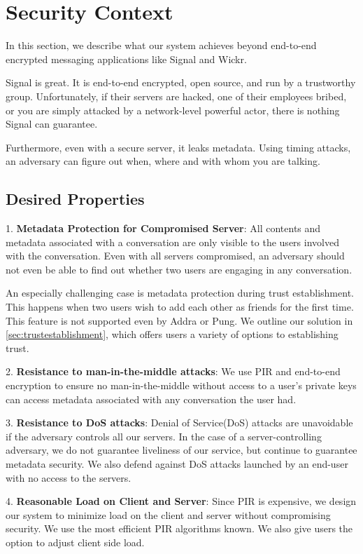 \section{Security Context}
\label{sec:securitycontext}


In this section, we describe what our system achieves beyond end-to-end encrypted messaging applications like Signal and Wickr.

Signal is great. It is end-to-end encrypted, open source, and run by a trustworthy group. Unfortunately, if their servers are hacked, one of their employees bribed, or you are simply attacked by a network-level powerful actor, there is nothing Signal can guarantee. 

Furthermore, even with a secure server, it leaks metadata. Using timing attacks, an adversary can figure out when, where and with whom you are talking. 

\subsection{Desired Properties}

1. \textbf{Metadata Protection for Compromised Server}: All contents and metadata associated with a conversation are only visible to the users involved with the conversation. Even with all servers compromised, an adversary should not even be able to find out whether two users are engaging in any conversation.

An especially challenging case is metadata protection during trust establishment. This happens when two users wish to add each other as friends for the first time. This feature is not supported even by Addra or Pung. We outline our solution in \cref{sec:trustestablishment}, which offers users a variety of options to establishing trust.

2. \textbf{Resistance to man-in-the-middle attacks}: We use PIR and end-to-end encryption to ensure no man-in-the-middle without access to a user's private keys can access metadata associated with any conversation the user had.

3. \textbf{Resistance to DoS attacks}: Denial of Service(DoS) attacks are unavoidable if the adversary controls all our servers. In the case of a server-controlling adversary, we do not guarantee liveliness of our service, but continue to guarantee metadata security. We also defend against DoS attacks launched by an end-user with no access to the servers.

4. \textbf{Reasonable Load on Client and Server}: Since PIR is expensive, we design our system to minimize load on the client and server without compromising security. We use the most efficient PIR algorithms known. We also give users the option to adjust client side load. 
